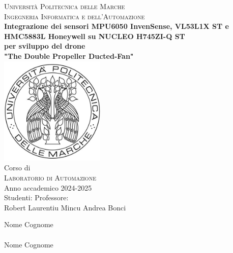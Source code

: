 \documentclass[11pt]{report}
\begin{document}
\begin{titlepage}
    \begin{center}
    \LARGE {\scshape{Università Politecnica delle Marche}}\\[0.5cm]
    \LARGE {\scshape{Ingegneria Informatica e dell'Automazione}}\\[0.7cm]
    \linespread{1}
    \huge {\bfseries Integrazione dei sensori MPU6050 InvenSense, VL53L1X ST e HMC5883L Honeywell su NUCLEO H745ZI-Q ST}\\
    \huge {\bfseries per sviluppo del drone}\\
    \vspace{0.3cm}
    \huge {\bfseries "The Double Propeller Ducted-Fan"}\\[1cm]
    \linespread{1}
    \includegraphics[width=5cm]{images/logoUnivpm.jpg}\\[0.5cm]
    \linespread{1.2}
    \Large Corso di\\
    \Large {\scshape{Laboratorio di Automazione}} \\[0.3cm]
    \Large {Anno accademico 2024-2025 \\[0.8cm]}
    {\Large Studenti:}
    \hfill {\Large Professore:}\\
    {\Large Robert Laurentiu Mincu}
    \hfill
    {\Large Andrea Bonci}\\
    \raggedright{\Large Nome Cognome\\}
    \\
    {\Large Nome Cognome\\[1cm]}
    \end{center}
    \end{titlepage}
    
\end{document}
